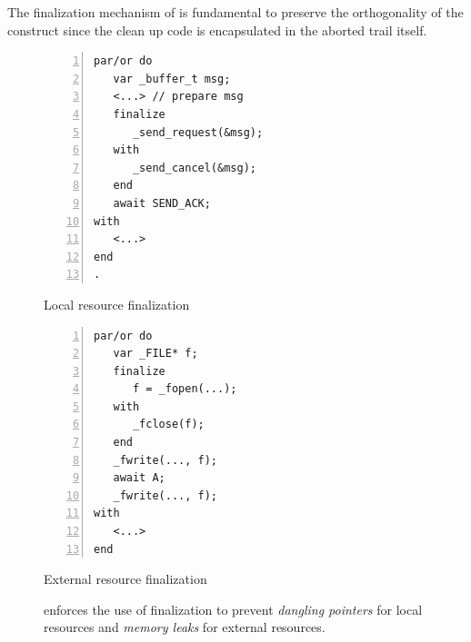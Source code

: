 The finalization mechanism of \CEU is fundamental to preserve the orthogonality
of the  construct since the clean up code is encapsulated in the
aborted trail itself.

\begin{figure}
\begin{minipage}[t]{0.48\linewidth}
\begin{lstlisting}[numbers=left,xleftmargin=3.5em,mathescape=true]
par/or do
   var _buffer_t msg;
   <...> // prepare msg
   finalize
      _send_request(&msg);
   with
      _send_cancel(&msg);
   end
   await SEND_ACK;
with
   <...>
end
.
\end{lstlisting}
\centering\small{\ax Local resource finalization}
\end{minipage}
%
\begin{minipage}[t]{0.48\linewidth}
\begin{lstlisting}[numbers=left,xleftmargin=3.5em]
par/or do
   var _FILE* f;
   finalize
      f = _fopen(...);
   with
      _fclose(f);
   end
   _fwrite(..., f);
   await A;
   _fwrite(..., f);
with
   <...>
end
\end{lstlisting}
\centering\small{\bx External resource finalization}
\end{minipage}
\caption{
\CEU enforces the use of finalization to prevent \emph{dangling pointers} for
local resources and \emph{memory leaks} for external resources.
\label{lst.fin.ceu}
}
\end{figure}
